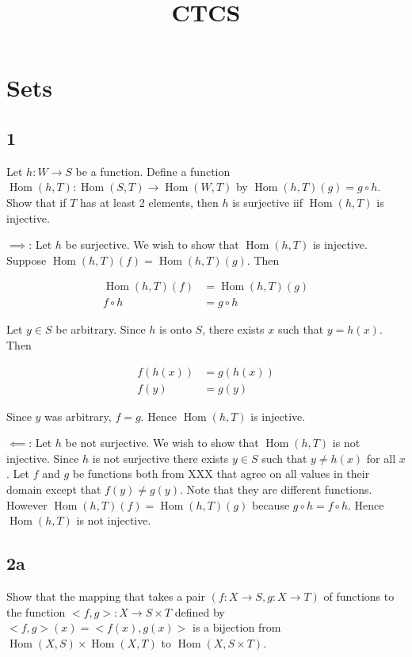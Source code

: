 \documentclass{article}
\title{CTCS}
\date{}
\DeclareMathOperator{\Hom}{Hom}
\begin{document}
\maketitle


\section*{Sets}

\subsection*{1}

Let $h: W \rightarrow S$ be a function. Define a function $\Hom(h, T): \Hom(S, T) \to \Hom(W, T)$ by $\Hom(h, T)(g) = g \circ h$. Show that if $T$ has at least 2 elements, then $h$ is surjective iif $\Hom(h, T)$ is injective.

$\implies$: Let $h$ be surjective. We wish to show that $\Hom(h, T)$ is injective. Suppose $\Hom(h, T)(f) = \Hom(h, T)(g)$. Then

\begin{align}
\Hom(h, T)(f) &= \Hom(h, T)(g) \\
f \circ h &= g \circ h
\end{align}

Let $y \in S$ be arbitrary. Since $h$ is onto $S$, there exists $x$ such that $y = h(x)$. Then

\begin{align}
f(h(x)) &= g(h(x)) \\
f(y) &= g(y)
\end{align}

Since $y$ was arbitrary, $f = g$. Hence $\Hom(h, T)$ is injective.

$\impliedby$: Let $h$ be not surjective. We wish to show that $\Hom(h, T)$ is not injective. Since $h$ is not surjective there exists $y \in S$ such that $y \ne h(x)$ for all $x$. Let $f$ and $g$ be functions both from XXX that agree on all values in their domain except that $f(y) \ne g(y)$. Note that they are different functions. However $\Hom(h, T)(f) = \Hom(h, T)(g)$ because $g \circ h = f \circ h$. Hence $\Hom(h, T)$ is not injective.

\subsection*{2a}

Show that the mapping that takes a pair $(f: X \to S, g: X \to T)$ of functions to the function $<f, g>: X \to S \times T$ defined by $<f, g>(x) = <f(x), g(x)>$ is a bijection from $\Hom(X, S) \times \Hom(X, T)$ to $\Hom(X, S \times T)$.
\end{document}
